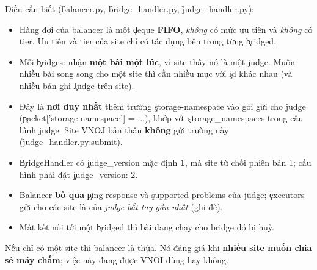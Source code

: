 Điều cần biết (\f{balancer.py}, \f{bridge_handler.py}, \f{judge_handler.py}):
\begin{itemize}
\item Hàng đợi của balancer là một \c{deque} \textbf{FIFO}, \emph{không} có mức ưu tiên và \emph{không} có tier. Ưu tiên và tier của site chỉ có tác dụng bên trong từng \c{bridged}. \tS
\item Mỗi \c{bridges:} nhận \textbf{một bài một lúc}, vì site thấy nó là một judge. Muốn nhiều bài song song cho một site thì cần nhiều mục với \c{id} khác nhau (và nhiều bản ghi \c{Judge} trên site). \tI
\item Đây là \textbf{nơi duy nhất} thêm trường \c{storage-namespace} vào gói gửi cho judge (\c{packet['storage-namespace'] = ...}), khớp với \c{storage_namespaces} trong cấu hình judge. Site VNOJ bản thân \textbf{không} gửi trường này (\f{judge_handler.py:submit}). \tS
\item \c{BridgeHandler} có \c{judge_version} mặc định \textbf{1}, mà site từ chối phiên bản 1; cấu hình phải đặt \c{judge_version: 2}. \tS
\item Balancer \textbf{bỏ qua} \c{ping-response} và \c{supported-problems} của judge; \c{executors} gửi cho các site là của \emph{judge bắt tay gần nhất} (ghi đè). \tS
\item Mất kết nối tới một \c{bridged} thì bài đang chạy cho bridge đó bị huỷ. \tS
\end{itemize}
Nếu chỉ có một site thì balancer là thừa. Nó đáng giá khi \textbf{nhiều site muốn chia sẻ máy chấm}; việc này \tQ đang được VNOI dùng hay không.

